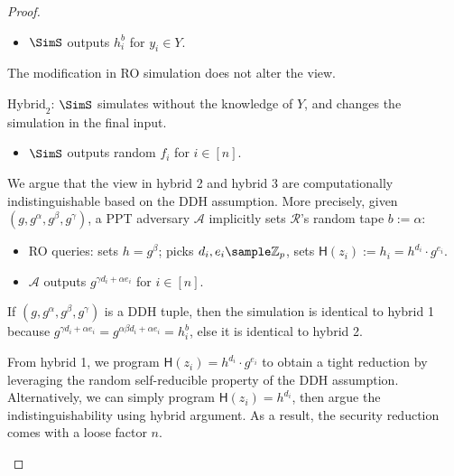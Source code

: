 \begin{proof}
\begin{trivlist}
\begin{itemize}
    \item $\SimS$ outputs $h_i^b$ for $y_i \in Y$.            
\end{itemize}
The modification in RO simulation does not alter the view. 

\begin{center}
\end{center}

\item $\text{Hybrid}_2$: $\SimS$ simulates without the knowledge of $Y$, 
    and changes the simulation in the final input.  
\begin{itemize}
    \item $\SimS$ outputs random $f_i$ for $i \in [n]$.       
\end{itemize}
We argue that the view in hybrid 2 and hybrid 3 are computationally indistinguishable based on the DDH assumption. 
More precisely, given $(g, g^\alpha, g^\beta, g^\gamma)$, 
a PPT adversary $\mathcal{A}$  implicitly sets $\mathcal{R}$'s random tape $b:=\alpha$: 
\begin{itemize}
    \item RO queries: sets $h = g^\beta$; picks $d_i, e_i \sample \mathbb{Z}_p$, 
        sets $\mathsf{H}(z_i):=h_i = h^{d_i} \cdot g^{e_i}$. 

    \item $\mathcal{A}$ outputs $g^{\gamma d_i + \alpha e_i}$ for $i \in [n]$.      
\end{itemize}

If $(g, g^\alpha, g^\beta, g^\gamma)$ is a DDH tuple, 
then the simulation is identical to hybrid 1 because $g^{\gamma d_i + \alpha e_i} = g^{\alpha \beta d_i + \alpha e_i} = h_i^b$, 
else it is identical to hybrid 2. 
\end{trivlist}

\begin{remark}
From hybrid 1, we program $\mathsf{H}(z_i) = h^{d_i} \cdot g^{e_i}$ 
to obtain a tight reduction by leveraging the random self-reducible property of the DDH assumption. 
Alternatively, we can simply program $\mathsf{H}(z_i) = h^{d_i}$, then argue the indistinguishability using hybrid argument. 
As a result, the security reduction comes with a loose factor $n$.    
\end{remark}


\end{proof}
